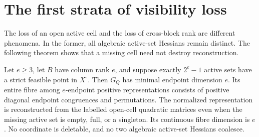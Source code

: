 \section{The first strata of visibility loss}\label{sec:walls}
The loss of an open active cell and the loss of cross-block rank are different
phenomena. In the former, all algebraic active-set Hessians remain distinct.
The following theorem shows that a missing cell need not destroy reconstruction.

\begin{theorem}\label{thm:one-missing}
Let $e\ge3$, let $B$ have column rank $e$, and suppose exactly $2^e-1$ active
sets have a strict feasible point in $X^\circ$. Then $G_Q$ has minimal endpoint
dimension $e$. Its entire fibre among $e$-endpoint positive representations
consists of positive diagonal endpoint congruences and permutations. The
normalized representation is reconstructed from the labelled open-cell
quadratic matrices even when the missing active set is empty, full, or a
singleton. Its continuous fibre dimension is $e$. No coordinate is deletable,
and no two algebraic active-set Hessians coalesce.
\end{theorem}
